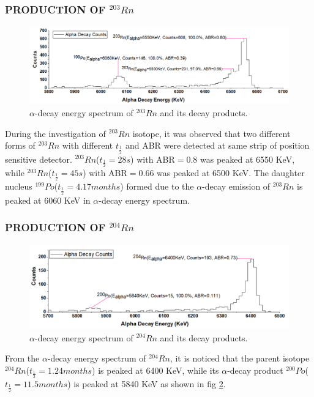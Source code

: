 \documentclass[12pt]{article}
\begin{document}
\subsubsection{PRODUCTION OF $^{203}Rn$}
\begin{figure}[h]
\centering
\includegraphics[scale=0.5]{Rn203.png}
\caption{$\alpha$-decay energy spectrum of $^{203}Rn$ and its decay products.}
\label{alpha-decay energy spectrum of 203Rn and its decay products.}
\end{figure}

During the investigation of $^{203}Rn$ isotope, it was observed that two different forms of $^{203}Rn$ with different $t_\frac{1}{2}$ and ABR were detected at same strip of position sensitive detector. $^{203}Rn$($t_\frac{1}{2}=28s$) with ABR$=$0.8 was peaked at 6550 KeV, while $^{203}Rn$($t_\frac{1}{2}=45s$) with ABR$=$0.66 was peaked at 6500 KeV. The daughter nucleus $^{199}Po$($t_\frac{1}{2}=4.17 months$) formed due to the $\alpha$-decay emission of $^{203}Rn$ is peaked at 6060 KeV in $\alpha$-decay energy spectrum.

\subsubsection{PRODUCTION OF $^{204}Rn$}
\begin{figure}[h]
\centering
\includegraphics[scale=0.5]{Rn204.png}
\caption{$\alpha$-decay energy spectrum of $^{204}Rn$ and its decay products.}
\label{alpha-decay energy spectrum of 204Rn and its decay products.}
\end{figure}

From the $\alpha$-decay energy spectrum of $^{204}Rn$, it is noticed that the parent isotope $^{204}Rn$($t_\frac{1}{2}=1.24 months$) is peaked at 6400 KeV, while its $\alpha$-decay product $^{200}Po$($t_\frac{1}{2}=11.5 months$) is peaked at 5840 KeV as shown in fig \ref{alpha-decay energy spectrum of 204Rn and its decay products.}.   
\end{document}
